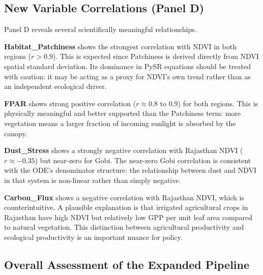 \documentclass[12pt, a4paper]{article}
\begin{document}
\subsection{New Variable Correlations (Panel D)}

Panel D reveals several scientifically meaningful relationships.

\textbf{Habitat\_Patchiness} shows the strongest correlation with NDVI in
both regions ($r > 0.9$). This is expected since Patchiness is derived
directly from NDVI spatial standard deviation. Its dominance in PySR
equations should be treated with caution: it may be acting as a proxy for
NDVI's own trend rather than as an independent ecological driver.

\textbf{FPAR} shows strong positive correlation ($r \approx 0.8$ to 0.9)
for both regions. This is physically meaningful and better supported than
the Patchiness term: more vegetation means a larger fraction of incoming
sunlight is absorbed by the canopy.

\textbf{Dust\_Stress} shows a strongly negative correlation with Rajasthan
NDVI ($r \approx -0.35$) but near-zero for Gobi. The near-zero Gobi
correlation is consistent with the ODE's denominator structure: the
relationship between dust and NDVI in that system is non-linear rather
than simply negative.

\textbf{Carbon\_Flux} shows a negative correlation with Rajasthan NDVI,
which is counterintuitive. A plausible explanation is that irrigated
agricultural crops in Rajasthan have high NDVI but relatively low GPP per
unit leaf area compared to natural vegetation. This distinction between
agricultural productivity and ecological productivity is an important nuance
for policy.

\subsection{Overall Assessment of the Expanded Pipeline}
\end{document}
